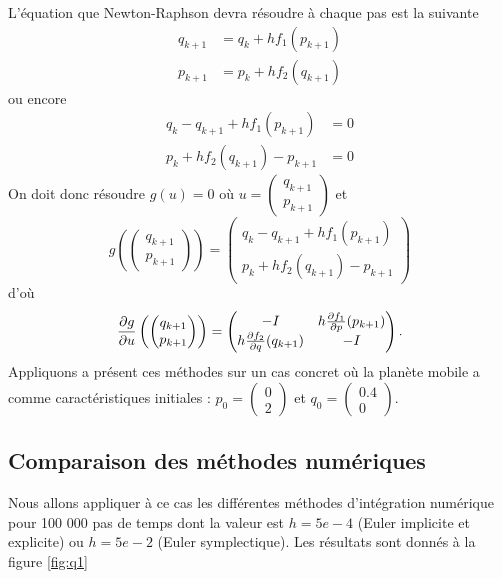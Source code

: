 L'équation que Newton-Raphson devra résoudre à chaque pas est la suivante
\begin{align*}
  q_{k+1} & = q_k + hf_1(p_{k+1})\\
  p_{k+1} & = p_k + hf_2(q_{k+1})
\end{align*}
ou encore
\begin{align*}
  q_k - q_{k+1} + hf_1(p_{k+1}) & = 0\\
  p_k + hf_2(q_{k+1}) - p_{k+1} & = 0
\end{align*}
On doit donc résoudre $g(u) = 0$ où
$u =
\begin{pmatrix}
  q_{k+1}\\
  p_{k+1}
\end{pmatrix}$
et
\[
  g
  \left(
    \begin{pmatrix}
      q_{k+1}\\
      p_{k+1}
    \end{pmatrix}
  \right) =
  \begin{pmatrix}
    q_k - q_{k+1} + hf_1(p_{k+1})\\
    p_k + hf_2(q_{k+1}) - p_{k+1}
  \end{pmatrix}
\]
d'où
\[
  \frac{\partial g}{\partial u}
  \left(
    \begin{pmatrix}
      q_{k+1}\\
      p_{k+1}
    \end{pmatrix}
  \right) =
  \begin{pmatrix}
    -I & h\frac{\partial f_1}{\partial p}(p_{k+1})\\
    h\frac{\partial f_2}{\partial q}(q_{k+1}) & -I
  \end{pmatrix}.
\]
Appliquons a présent ces méthodes sur un cas concret où la planète mobile a comme caractéristiques initiales : $p_0 = \begin{pmatrix}
0\\
2
\end{pmatrix}
$ et $q_0 = \begin{pmatrix}
0.4\\
0
\end{pmatrix} 
$.\\

\subsection{Comparaison des méthodes numériques}
Nous allons appliquer à ce cas les différentes méthodes d'intégration numérique pour 100 000 pas de temps dont la valeur est $h=5e-4$ (Euler implicite et explicite) ou $h=5e-2$ (Euler symplectique). Les résultats sont donnés à la figure \ref{fig:q1}


